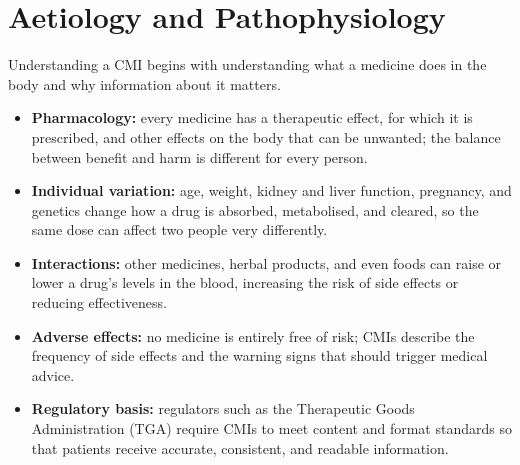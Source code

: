 \section*{Aetiology and Pathophysiology}
Understanding a CMI begins with understanding what a medicine does in the body and why information about it matters.
\begin{itemize}
    \item \textbf{Pharmacology:} every medicine has a therapeutic effect, for which it is prescribed, and other effects on the body that can be unwanted; the balance between benefit and harm is different for every person.
    \item \textbf{Individual variation:} age, weight, kidney and liver function, pregnancy, and genetics change how a drug is absorbed, metabolised, and cleared, so the same dose can affect two people very differently.
    \item \textbf{Interactions:} other medicines, herbal products, and even foods can raise or lower a drug's levels in the blood, increasing the risk of side effects or reducing effectiveness.
    \item \textbf{Adverse effects:} no medicine is entirely free of risk; CMIs describe the frequency of side effects and the warning signs that should trigger medical advice.
    \item \textbf{Regulatory basis:} regulators such as the Therapeutic Goods Administration (TGA) require CMIs to meet content and format standards so that patients receive accurate, consistent, and readable information.
\end{itemize}

